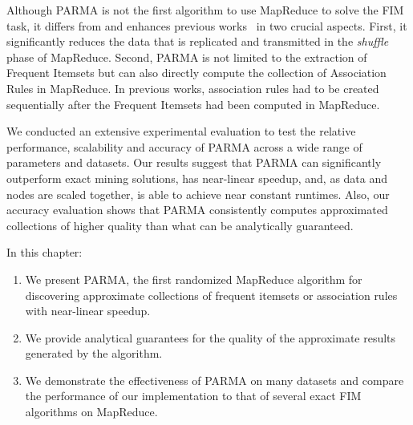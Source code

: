 Although PARMA is not the first algorithm to use MapReduce to solve the
FIM task, it differs from and enhances previous
works~\citep{CryansRC10,GhotingKPK11,Hammoud11,LiWZZC08,LiZ11,YangLF10,ZhouZCLF10}
in two crucial aspects. First, it significantly reduces the data that is
replicated and transmitted in the \emph{shuffle} phase of MapReduce.  Second,
PARMA is not limited to the extraction of Frequent Itemsets but can also
directly compute the collection of Association Rules in MapReduce. In previous
works, association rules had to be created sequentially after the Frequent
Itemsets had been computed in MapReduce. 

We conducted an extensive experimental evaluation to test the relative
performance, scalability and accuracy of PARMA across a wide range of
parameters and datasets. Our results suggest that PARMA can
significantly outperform exact mining solutions, has
near-linear speedup, and, as data and nodes are scaled together, is
able to achieve near constant runtimes. Also, our accuracy evaluation
shows that PARMA consistently computes approximated collections
of higher quality than what can be analytically guaranteed.

In this chapter:
\begin{enumerate}
\item We present PARMA, the first randomized MapReduce algorithm for discovering
  approximate collections of frequent itemsets or association rules with
  near-linear speedup.
\item We provide analytical guarantees for the quality of the approximate
  results generated by the algorithm.
\item We demonstrate the effectiveness of PARMA on many datasets and compare
  the performance of our implementation to that of several exact FIM algorithms
  on MapReduce.
\end{enumerate}

